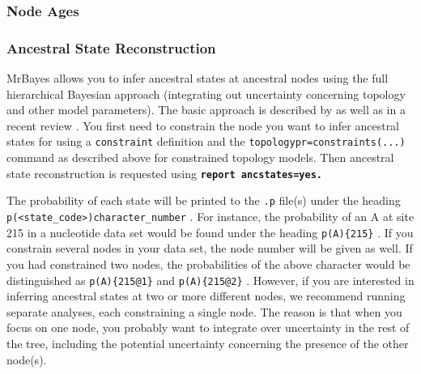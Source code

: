 \documentclass[12pt]{book}
\newcommand{\ttt}[1]{\texttt{#1} }
\newcommand{\tb}[1]{\texttt{\textbf{#1}} }
\begin{document}
\subsubsection{Node Ages}

\subsubsection{Ancestral State Reconstruction}
MrBayes allows you to infer ancestral states at ancestral nodes using the full hierarchical
Bayesian approach (integrating out uncertainty concerning topology and other model
parameters). The basic approach is described by \citet{huelsenbeck01a} as
well as in a recent review \citep{ronquist04a}. You first need to constrain the node you want
to infer ancestral states for using a \ttt{constraint} definition and the
\ttt{topologypr=constraints(...)} command as described above for constrained
topology models. Then ancestral state reconstruction is requested using \tb{report
ancstates=yes.}

The probability of each state will be printed to the \ttt{.p} file(s) under the heading
\ttt{p(<state\_code>){character\_number}}. For instance, the probability of an A at
site 215 in a nucleotide data set would be found under the heading \ttt{p(A)\{215\}}. If you
constrain several nodes in your data set, the node number will be given as well. If you
had constrained two nodes, the probabilities of the above character would be
distinguished as \ttt{p(A)\{215@1\}} and \ttt{p(A)\{215@2\}}. However, if you are interested in
inferring ancestral states at two or more different nodes, we recommend running separate
analyses, each constraining a single node. The reason is that when you focus on one node,
you probably want to integrate over uncertainty in the rest of the tree, including the
potential uncertainty concerning the presence of the other node(s).
\end{document}
